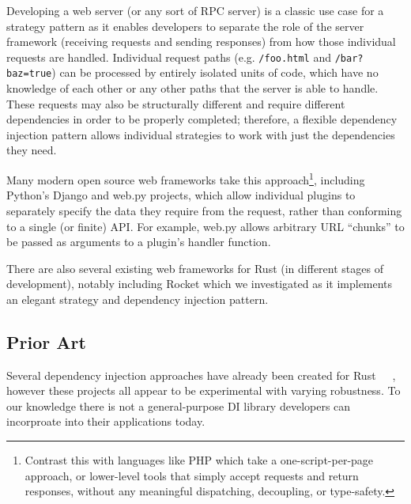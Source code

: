 \documentclass[sigconf]{acmart}
\begin{document}
Developing a web server (or any sort of RPC server) is a classic use case for a strategy pattern as it enables developers to separate the role of the server framework (receiving requests and sending responses) from how those individual requests are handled. Individual request paths (e.g. \lstinline{/foo.html} and \lstinline{/bar?baz=true}) can be processed by entirely isolated units of code, which have no knowledge of each other or any other paths that the server is able to handle. These requests may also be structurally different and require different dependencies in order to be properly completed; therefore, a flexible dependency injection pattern allows individual strategies to work with just the dependencies they need.

Many modern open source web frameworks take this approach\footnote{Contrast this with languages like PHP which take a one-script-per-page approach, or lower-level tools that simply accept requests and return responses, without any meaningful dispatching, decoupling, or type-safety.}, including Python's Django and web.py projects, which allow individual plugins to separately specify the data they require from the request, rather than conforming to a single (or finite) API. For example, web.py allows arbitrary URL ``chunks'' to be passed as arguments to a plugin's handler function.

There are also several existing web frameworks for Rust\cite{github:rust-frameworks} (in different stages of development), notably including Rocket\cite{rocket} which we investigated as it implements an elegant strategy and dependency injection pattern.

\subsection{Prior Art} \label{prior-art}

Several dependency injection approaches have already been created for Rust~\cite{rust-ioc}~\cite{di-rs}~\cite{hypospray}, however these projects all appear to be experimental with varying robustness. To our knowledge there is not a general-purpose DI library developers can incorproate into their applications today.
\end{document}
